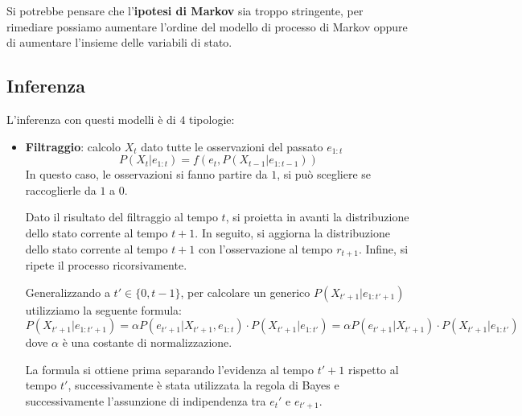 Si potrebbe pensare che l'\textbf{ipotesi di Markov} sia troppo stringente, per
rimediare possiamo aumentare l'ordine del modello di processo di Markov oppure di
aumentare l'insieme delle variabili di stato.
\subsection{Inferenza}
L'inferenza con questi modelli è di $4$ tipologie:
\begin{itemize}
    \item \textbf{Filtraggio}: calcolo $X_t$ dato tutte le osservazioni del
          passato $e_{1:t}$
          \begin{equation}
              P(X_t | e_{1:t})= f(e_t, P(X_{t-1}|e_{1:t-1}))
          \end{equation}
          In questo caso, le osservazioni si fanno partire da $1$, si può
          scegliere se raccoglierle da $1$ a $0$.

          Dato il risultato del filtraggio al tempo $t$, si proietta in avanti
          la distribuzione dello stato corrente al tempo $t + 1$. In seguito, si
          aggiorna la distribuzione dello stato corrente al tempo $t + 1$ con
          l'osservazione al tempo $r_{t + 1}$. Infine, si ripete il processo
          ricorsivamente.

          Generalizzando a $t' \in \{0,t-1\}$, per calcolare un generico $P(X_{t'+1}|e_{1:t'+1})$
          utilizziamo la seguente formula:
          \begin{equation}
              P(X_{t'+1} | e_{1:t'+1}) = \alpha P(e_{t'+1}|X_{t'+1}, e_{1:t})\cdot P(X_{t' + 1}|e_{1:t'})
              =\alpha P(e_{t'+1}|X_{t'+1})\cdot P(X_{t'+1}|e_{1:t'})
          \end{equation}
          dove $\alpha$ è una costante di normalizzazione.

          La formula si ottiene prima separando l'evidenza al tempo $t'+1$
          rispetto al tempo $t'$, successivamente è stata utilizzata la regola
          di Bayes e successivamente l'assunzione di indipendenza tra $e_t'$ e
          $e_{t'+1}$.


\end{itemize}
